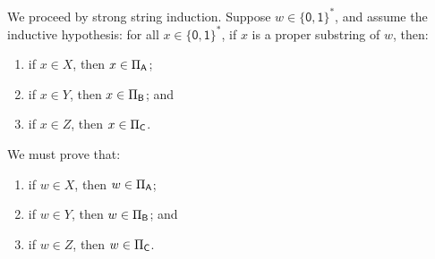 We proceed by strong string induction.  Suppose
$w\in\{\mathsf{0,1}\}^*$, and assume the inductive hypothesis:
for all $x\in\{\mathsf{0,1}\}^*$, if $x$ is a proper substring of
$w$, then:
\begin{enumerate}[\quad(A)]
\item if $x\in X$, then $x\in\Pi_{\mathsf{A}}$;

\item if $x\in Y$, then $x\in\Pi_{\mathsf{B}}$; and

\item if $x\in Z$, then $x\in\Pi_{\mathsf{C}}$.
\end{enumerate}
We must prove that:
\begin{enumerate}[\quad(A)]
\item if $w\in X$, then $w\in\Pi_{\mathsf{A}}$;

\item if $w\in Y$, then $w\in\Pi_{\mathsf{B}}$; and

\item if $w\in Z$, then $w\in\Pi_{\mathsf{C}}$.
\end{enumerate}

